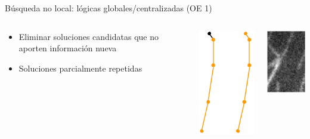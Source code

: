 
\begin{frame}{B\'usqueda no local: l\'ogicas globales/centralizadas (OE 1)}
    
    \begin{columns}
        \begin{column}{0.4\textwidth}
            \begin{itemize}
                \item Eliminar soluciones candidatas que no aporten informaci\'on nueva
                \item Soluciones parcialmente repetidas
            \end{itemize}
        \end{column}
        \begin{column}{0.2\textwidth}
        \includegraphics[scale=0.5]{Pictures/ant-segments-repetead-sol1.png}
        \end{column}
        \begin{column}{0.2\textwidth}
        \includegraphics[scale=0.5]{Pictures/NoConsenso2.png}

\end{column}
\end{columns}
\end{frame}
